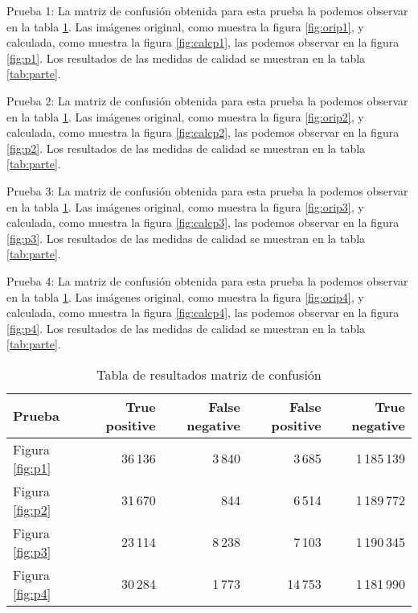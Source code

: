 Prueba 1: La matriz de confusión obtenida para esta prueba la podemos observar en la tabla \ref{tab:pruebas}.
Las imágenes original, como muestra la figura \ref{fig:orip1}, y calculada, como muestra la figura \ref{fig:calcp1}, las podemos observar en la figura \ref{fig:p1}.
Los resultados de las medidas de calidad se muestran en la tabla \ref{tab:parte}.

Prueba 2: La matriz de confusión obtenida para esta prueba la podemos observar en la tabla \ref{tab:pruebas}.
Las imágenes original, como muestra la figura \ref{fig:orip2}, y calculada, como muestra la figura \ref{fig:calcp2}, las podemos observar en la figura \ref{fig:p2}.
Los resultados de las medidas de calidad se muestran en la tabla \ref{tab:parte}.

Prueba 3: La matriz de confusión obtenida para esta prueba la podemos observar en la tabla \ref{tab:pruebas}.
Las imágenes original, como muestra la figura \ref{fig:orip3}, y calculada, como muestra la figura \ref{fig:calcp3}, las podemos observar en la figura \ref{fig:p3}.
Los resultados de las medidas de calidad se muestran en la tabla \ref{tab:parte}.

Prueba 4: La matriz de confusión obtenida para esta prueba la podemos observar en la tabla \ref{tab:pruebas}.
Las imágenes original, como muestra la figura \ref{fig:orip4}, y calculada, como muestra la figura \ref{fig:calcp4}, las podemos observar en la figura \ref{fig:p4}.
Los resultados de las medidas de calidad se muestran en la tabla \ref{tab:parte}.




\begin{table}[]
\centering
\caption{Tabla de resultados matriz de confusión}
\label{tab:pruebas}
\begin{tabular}{ lrrrr }
\toprule
Prueba                & True positive & False negative & False positive & True negative \\ \midrule
Figura \ref{fig:p1} & 36\,136         & 3\,840           & 3\,685           & 1\,185\,139       \\ 
Figura \ref{fig:p2} & 31\,670         & 844            & 6\,514           & 1\,189\,772       \\ 
Figura \ref{fig:p3} & 23\,114         & 8\,238           & 7\,103           & 1\,190\,345       \\ 
Figura \ref{fig:p4} & 30\,284         & 1\,773           & 14\,753          & 1\,181\,990       \\ \bottomrule
\end{tabular}
\end{table}



